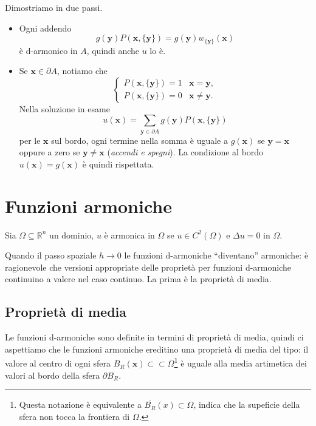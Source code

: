 \documentclass[10pt,a4paper,twoside,openright]{book}
\newcommand{\x}{\mathbf{x}}
\newcommand{\y}{\mathbf{y}}
\begin{document}
\begin{dimostrazione} Dimostriamo in due passi.
    \begin{itemize}
        \item Ogni addendo
              \begin{equation*}
                  g(\y) P(\x,\{\y\}) =g(\y) w_{\{\y\}}(\x)
              \end{equation*}
              è d-armonico in $A$, quindi anche $u$ lo è.

        \item Se $\x\in \partial A$, notiamo che
              \begin{equation*}
                  \begin{cases}
                      P(\x,\{\y\}) =1 & \x=\y,     \\
                      P(\x,\{\y\}) =0 & \x\neq \y.
                  \end{cases}
              \end{equation*}
              Nella soluzione in esame
              \begin{equation*}
                  u(\x) =\sum _{\y\in \partial A} g(\y) P(\x,\{\y\})
              \end{equation*}
              per le $\x$ sul bordo, ogni termine nella somma è uguale a $g(\x)$ se $\y=\x$ oppure a zero se $\y\neq \x$ (\textit{accendi e spegni}).
              La condizione al bordo $u(\x) =g(\x)$ è quindi rispettata.
    \end{itemize}
\end{dimostrazione}
\section{Funzioni armoniche}

Sia $\Omega \subseteq \mathbb{R}^{n}$ un dominio, $u$ è armonica in $\Omega $ se $u\in C^{2}(\Omega)$ e $\Delta u=0$ in $\Omega $.

Quando il passo spaziale $h\rightarrow 0$ le funzioni d-armoniche ``diventano'' armoniche: è ragionevole che versioni appropriate delle proprietà per funzioni d-armoniche continuino a valere nel caso continuo. La prima è la proprietà di media.
\subsection{Proprietà di media}

Le funzioni d-armoniche sono definite in termini di proprietà di media, quindi ci aspettiamo che le funzioni armoniche ereditino una proprietà di media del tipo: il valore al centro di ogni sfera $B_{R}(\x) \subset \subset \Omega $\footnote{Questa notazione è equivalente a $\overline{B_{R}}(x) \subset \Omega $, indica che la supeficie della sfera non tocca la frontiera di $\Omega $.} è uguale alla media artimetica dei valori al bordo della sfera $\partial B_{R}$.
\end{document}
